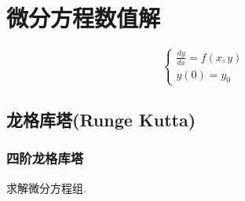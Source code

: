 \chapter{微分方程数值解}


\begin{problem}[带初值常微分方程]
	\begin{equation}
		\begin{cases}
			\frac{dy}{dx}=f(x,y)\\
			y(0)=y_0
		\end{cases}
	\end{equation}
\end{problem}


\section{龙格库塔(Runge Kutta)}
\subsection{四阶龙格库塔}



求解微分方程组.